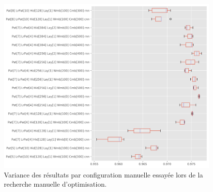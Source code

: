 \begin{figure}
    \centering
    \includegraphics[width=\textwidth]{figures/chap3/entrainement/StabilityBoxPlot.png}
    \caption{Variance des résultats par configuration manuelle essayée lors de la recherche manuelle d'optimisation.}
    \label{fig:training_variation_per_model}
\end{figure}